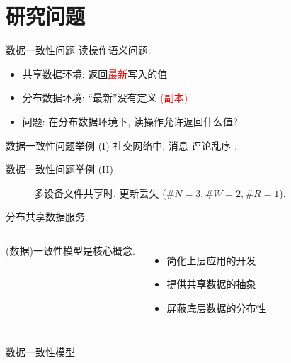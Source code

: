 \section{研究问题}

\begin{frame}{数据一致性问题}
  读操作语义问题:
  \begin{itemize}
	\setlength{\itemsep}{10pt}
	\item 共享数据环境: 返回\textcolor{red}{最新}写入的值
	\item 分布数据环境: ``最新''没有定义 \textcolor{red}{\small (副本)}
	\item {}问题: 在分布数据环境下, 读操作允许返回什么值?
  \end{itemize}
\end{frame}
\begin{frame}{数据一致性问题举例 (I)}
  {社交网络中, 消息-评论乱序 .}
\end{frame}
\begin{frame}{数据一致性问题举例 (II)}
  \begin{figure}[h!]
    \centering
    \begin{adjustbox}{max totalsize = {0.65\textwidth}{0.65\textheight}, center}
      
    \end{adjustbox}
    \caption{多设备文件共享时, 更新丢失 ($\#N = 3, \#W = 2, \#R = 1$).}
  \end{figure}
\end{frame}
\begin{frame}{分布共享数据服务}
  \begin{columns}
	  (数据)一致性模型是核心概念.
	  \begin{itemize}[<+->]
		\setlength\itemsep{10pt}
		\item 简化上层应用的开发
		\item 提供共享数据的抽象
		\item 屏蔽底层数据的分布性
	  \end{itemize}
  \end{columns}
\end{frame}
\begin{frame}{数据一致性模型}
\end{frame}
